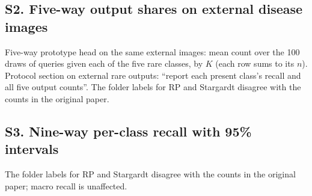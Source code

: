 \subsection*{S2. Five-way output shares on external disease images}
\begin{table}[!htbp]
\caption{Five-way head on external images labelled CSC/CSR or MH by OCTID or OCTDL: share of queries given their own class by $K$: mean over draws, and below it SD and 5th--95th percentiles over draws (prototype: 100 draws; logistic probe: 25). Supports are benchmark images only. These measure agreement with the datasets' published labels (OCTID CSC and MH: common classes in OCTID, tier D; OCTDL MH: tier B). MacTel, Stargardt and RP receive no external claim. All five output counts of the prototype head follow this table; those of the logistic probe are in \texttt{external\_transfer\_outputs.csv} (released).}
\label{tab:transfer}
\centering\footnotesize
\resizebox{\textwidth}{!}{}
\end{table}
{\footnotesize Five-way prototype head on the same external images: mean count over the 100 draws of queries given each of the five rare classes, by $K$ (each row sums to its $n$). Protocol section on external rare outputs: ``report each present class's recall and all five output counts''. \fnRS The folder labels for RP and Stargardt disagree with the counts in the original paper.\par}
{\footnotesize}

\subsection*{S3. Nine-way per-class recall with 95\% intervals}
\begin{table}[!htbp]
\caption{Nine-way per-class recall: count/denominator (rate; 95\% interval). Interval methods as in Table~\ref{tab:frr}. The Kermany rows include the 22 hold-out rare images.}
\label{tab:perclass}
\centering\scriptsize
\setlength{\tabcolsep}{3pt}

\par\smallskip
\parbox{\textwidth}{\footnotesize \fnRS The folder labels for RP and Stargardt disagree with the counts in the original paper; macro recall is unaffected.}
\end{table}

